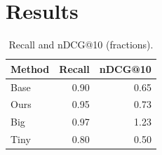 \documentclass{article}
\begin{document}
\begin{abstract}
We reach 95\% recall and an nDCG of 0.73.
\end{abstract}
\section{Results}
\begin{table}[h]\centering\caption{Recall and nDCG@10 (fractions).}
\begin{tabular}{lrr}
\toprule
Method & Recall & nDCG@10 \\
\midrule
Base & 0.90 & 0.65 \\
Ours & 0.95 & 0.73 \\
Big & 0.97 & 1.23 \\
Tiny & 0.80 & 0.50 \\
\bottomrule
\end{tabular}\end{table}
\end{document}
